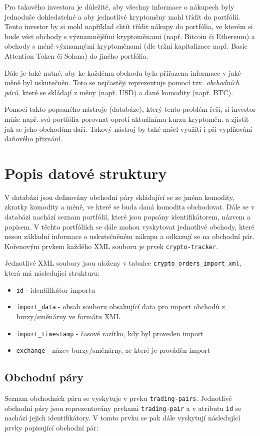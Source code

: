 \documentclass[12pt, a4paper]{article}
\let\oldsection\section
\renewcommand\section{\clearpage\oldsection}
\begin{document}
Pro takového investora je důležité, aby všechny informace o nákupech byly jednoduše dohledatelné a aby jednotlivé kryptoměny mohl třídit do portfólií. Tento investor by si mohl například chtít třídit nákupy do portfólia, ve kterém si bude vést obchody s významnějšími kryptoměnami (např. Bitcoin či Ethereum) a obchody s méně významnými kryptoměnami (dle tržní kapitalizace např. Basic Attention Token či Solana) do jiného portfólia.
    
Dále je také nutné, aby ke každému obchodu byla přiřazena informace v jaké měně byl uskutečněn. Toto se nejčastěji reprezentuje pomocí tzv. \textit{obchodních párů}, které se skládají z měny (např. USD) a dané komodity (např. BTC).

Pomocí takto popsaného nástroje (databáze), který tento problém řeší, si investor může např. svá portfólia porovnat oproti aktuálnímu kurzu kryptoměn, a zjistit jak se jeho obchodům daří. Takový nástroj by také našel využití i při vyplňování daňového přiznání.

\section{Popis datové struktury}

V databázi jsou definovány obchodní páry skládající se ze jména komodity, zkratky komodity a měně, ve které se buda daná komodita obchodovat. Dále se v databázi nachází seznam portfólií, které jsou popsány identifikátorem, názvem a popisem. V těchto portfóliích se dále mohou vyskytovat jednotlivé obchody, které nesou základní informace o uskutečněném nákupu a odkazují se na obchodní pár. Kořenovým prvkem každého XML souboru je prvek \texttt{crypto-tracker}.

Jednotlivé XML soubory jsou uloženy v tabulce \texttt{crypto\_orders\_import\_xml}, která má následující strukturu:

\begin{itemize}
    \item \texttt{id} - identifikátor importu
    \item \texttt{import\_data} - obsah souboru obsahující data pro import obchodů z burzy/směnárny ve formátu XML
    \item \texttt{import\_timestamp} - časové razítko, kdy byl proveden import
    \item \texttt{exchange} - název burzy/směnárny, ze které je prováděn import
\end{itemize}


\subsection{Obchodní páry}
Seznam obchodních páru se vyskytuje v prvku \texttt{trading-pairs}. Jednotlivé obchodní páry jsou reprezentovány prvkami \texttt{trading-pair} a v atributu \texttt{id} se nachází jejich identifikátory. V tomto prvku se pak dále vyskytují následující prvky popisující obchodní pár:
\end{document}
